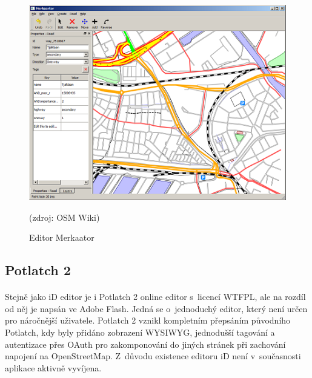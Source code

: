 \documentclass[11pt,a4paper,titlepage,oneside]{book}
\begin{document}
		\begin{figure}[!h]
			\begin{center}
				\includegraphics[width=12.5cm]{obrazky/merkaator_osm.png}
				\caption{Editor Merkaator} (zdroj: OSM Wiki\cite{wiki_merkaator})
			\end{center}
		\end{figure}

		\subsection{Potlatch 2}
			\paragraph{} Stejně jako iD editor je i Potlatch 2 online editor s~licencí \ac{WTFPL}, ale na rozdíl od něj je napsán ve Adobe Flash. Jedná se o~jednoduchý editor, který není určen pro náročnější uživatele. Potlatch 2 vznikl kompletním přepsáním původního Potlatch\cite{wiki_p2}, kdy byly přidáno zobrazení \ac{WYSIWYG}, jednodušší tagování a autentizace přes OAuth pro zakomponování do jiných stránek při zachování napojení na OpenStreetMap. Z~důvodu existence editoru iD není v~současnosti aplikace aktivně vyvíjena.

\end{document}
